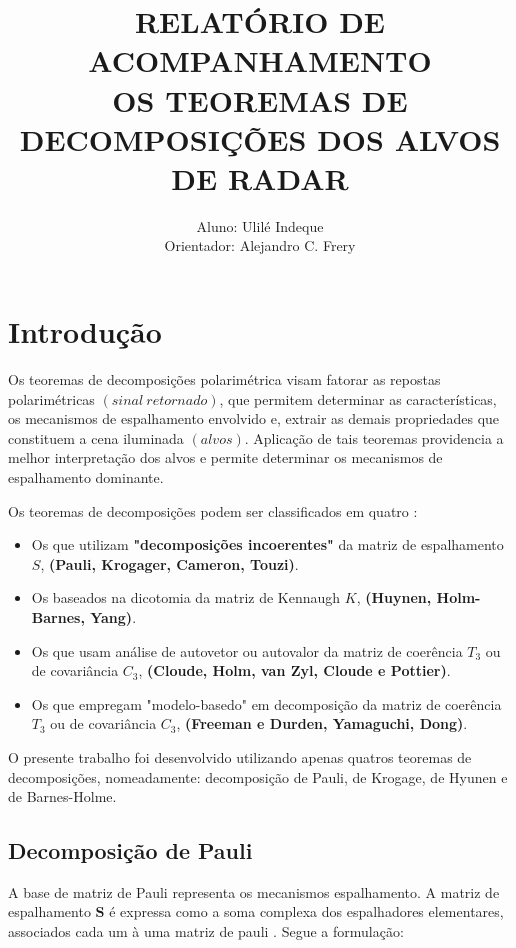 \documentclass{article}
\date{}
\title{RELATÓRIO DE ACOMPANHAMENTO \\ OS TEOREMAS DE DECOMPOSIÇÕES DOS ALVOS DE RADAR}
\author{Aluno: Ulilé Indeque \\ Orientador: Alejandro C. Frery}
\begin{document}
\maketitle

\section{Introdução} 
\label{sec:Dec}

Os teoremas de decomposições polarimétrica visam fatorar as repostas polarimétricas $(sinal \ retornado)$, que permitem determinar as características, os mecanismos de espalhamento envolvido e, extrair as demais propriedades que constituem a cena iluminada $(alvos)$. Aplicação de tais teoremas providencia a melhor interpretação dos alvos e permite determinar os mecanismos de espalhamento dominante.

Os teoremas de decomposições podem ser classificados em quatro \cite{jong:2009}: 

\begin{itemize}
    \item Os que utilizam \textbf{"decomposições incoerentes"} da matriz de espalhamento $S$, \textbf{(Pauli, Krogager, Cameron, Touzi)}.
    
    \item Os baseados na dicotomia da matriz de Kennaugh $K$, \textbf{(Huynen, Holm-Barnes, Yang)}.
    
    \item Os que usam análise de autovetor ou autovalor da matriz de coerência $T_{3}$ ou de covariância $C_{3}$, \textbf{(Cloude, Holm, van Zyl, Cloude e Pottier)}.
    
    \item Os que empregam "modelo-basedo" em decomposição da matriz de coerência $T_{3}$ ou de covariância $C_{3}$, \textbf{(Freeman e Durden, Yamaguchi, Dong)}.
\end{itemize}

O presente trabalho foi desenvolvido utilizando apenas quatros teoremas de decomposições, nomeadamente: decomposição de Pauli, de  Krogage, de Hyunen e de Barnes-Holme.

\subsection{\textbf{Decomposição de Pauli}}

A base de matriz de Pauli representa os mecanismos espalhamento. A matriz de espalhamento $\textbf{S}$ é expressa como a soma complexa dos espalhadores elementares, associados cada um à uma matriz de pauli \cite{jong:2009}. Segue a formulação:
\end{document}
